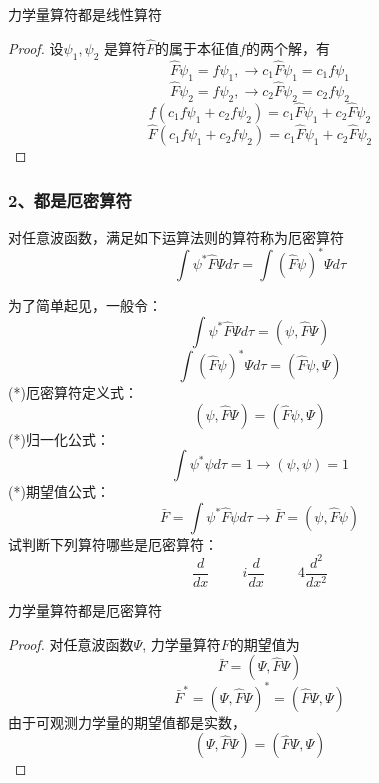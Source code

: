 \begin{frame} [allowframebreaks=]
    \begin{tcolorbox}[colback=yellow!10,colframe=red!75!black,title=命题]
      力学量算符都是线性算符  
    \end{tcolorbox}
    \begin{proof}
        设$\psi_1, \psi_2$ 是算符$\hat{F}$的属于本征值$f$的两个解，有\\
        $$\hat{F}\psi_1=f\psi_1, \to c_1\hat{F}\psi_1=c_1f\psi_1 $$
        $$\hat{F}\psi_2=f\psi_2, \to c_2\hat{F}\psi_2=c_2f\psi_2 $$
        $$f(c_1f\psi_1+c_2f\psi_2)=c_1\hat{F}\psi_1+c_2\hat{F}\psi_2$$
        $$\hat{F}(c_1f\psi_1+c_2f\psi_2)=c_1\hat{F}\psi_1+c_2\hat{F}\psi_2$$
    \end{proof}
\end{frame} 

\begin{frame} [allowframebreaks=]
    \frametitle{2、都是厄密算符}
    \begin{definition}
    对任意波函数，满足如下运算法则的算符称为厄密算符\\
        $$\int \psi^* \hat{F} \Psi d\tau =\int (\hat{F}\psi)^* \Psi d\tau $$
    \end{definition}
    为了简单起见，一般令： $$\int \psi^* \hat{F} \Psi d\tau= (\psi,\hat{F}\Psi)$$
    $$\int (\hat{F}\psi)^* \Psi d\tau = (\hat{F}\psi,\Psi) $$
    (*)厄密算符定义式： $$(\psi,\hat{F}\Psi)= (\hat{F}\psi,\Psi) $$
    (*)归一化公式： $$ \int \psi^{*} \psi d \tau=1 \to (\psi,\psi)=1$$
    (*)期望值公式： $$ \bar{F}=\int \psi^{*} \hat{F} \psi d \tau \to \bar{F}= (\psi,\hat{F}\psi) $$
    试判断下列算符哪些是厄密算符：\\
    $$\frac{d}{dx} \hspace{1cm}  i\frac{d}{dx} \hspace{1cm} 4\frac{d^2}{dx^2} $$
\end{frame} 

\begin{frame} [allowframebreaks=]
    \begin{tcolorbox}[colback=yellow!10,colframe=red!75!black,title=命题]
    力学量算符都是厄密算符  
    \end{tcolorbox}
    \begin{proof}
        对任意波函数$\Psi$, 力学量算符$F$的期望值为\\
        $$\bar{F}=(\Psi,\hat{F} \Psi) $$
        $$\bar{F}^*=(\Psi, \hat{F} \Psi)^* = (\hat{F}\Psi, \Psi) $$
        由于可观测力学量的期望值都是实数，\\
        $$(\Psi,\hat{F}\Psi)=(\hat{F} \Psi, \Psi) $$
    \end{proof}
\end{frame} 

